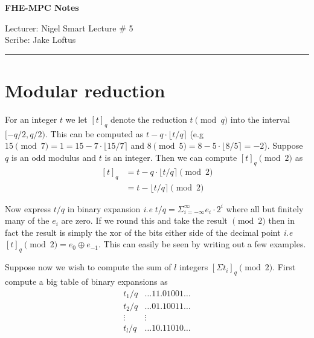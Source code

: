 \documentclass[11pt]{article}
\newcommand{\round}[1]{\lfloor #1 \rceil}
\begin{document}
\thispagestyle{empty}


\begin{center}
\bf\large FHE-MPC Notes
\end{center}

\noindent
Lecturer: Nigel Smart    %
\hfill
Lecture \#      5        %
\\
Scribe:   Jake Loftus    %
\hfill

\noindent
\rule{\textwidth}{1pt}

\medskip



\section{Modular reduction}
For an integer $t$ we let $[t]_q$ denote the reduction $t \pmod{q}$ into the interval $[-q/2,q/2)$.  This can be computed as $t-q\cdot\round{t/q}$ (e.g $15 \pmod{7} = 1 = 15 - 7 \cdot\round{15/7}$ and $8 \pmod{5} = 8 - 5\cdot\round{8/5} = -2$).  Suppose $q$ is an odd modulus and $t$ is an integer.  Then we can compute $[t]_q \pmod{2}$ as
\[
\begin{split}
[t]_q & = t - q\cdot\round{t/q} \pmod{2}\\
      & = t - \round{t/q} \pmod{2}
\end{split}
\] 

Now express $t/q$ in binary expansion \textit{i.e} $t/q = \Sigma_{i = - \infty}^{\infty} e_i\cdot 2^i$ where all but finitely many of the $e_i$ are zero.  If we round this and take the result $\pmod{2}$ then in fact the result is simply the xor of the bits either side of the decimal point \textit{i.e} $[t]_q \pmod{2} = e_0 \oplus e_{-1}$.  This can easily be seen by writing out a few examples.

Suppose now we wish to compute the sum of $l$ integers $[\Sigma t_i]_q \pmod{2}$.  First compute a big table of binary expansions as 
\[ \begin{array}{lc}
t_1/q  & \ldots 11.01001 \ldots \\
t_2/q  & \ldots 01.10011 \ldots \\
\vdots & \vdots                 \\ 
t_l/q  & \ldots 10.11010 \ldots   
\end{array}\]
\end{document}
